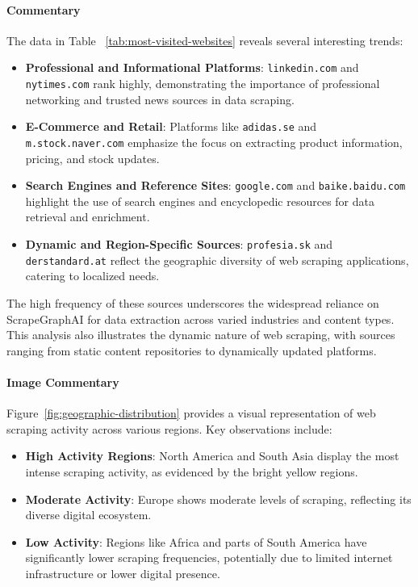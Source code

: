 \paragraph{Commentary}
The data in Table ~\ref{tab:most-visited-websites} reveals several interesting trends:
\begin{itemize}
    \item \textbf{Professional and Informational Platforms}: \texttt{linkedin.com} and \texttt{nytimes.com} rank highly, demonstrating the importance of professional networking and trusted news sources in data scraping.
    \item \textbf{E-Commerce and Retail}: Platforms like \texttt{adidas.se} and \texttt{m.stock.naver.com} emphasize the focus on extracting product information, pricing, and stock updates.
    \item \textbf{Search Engines and Reference Sites}: \texttt{google.com} and \texttt{baike.baidu.com} highlight the use of search engines and encyclopedic resources for data retrieval and enrichment.
    \item \textbf{Dynamic and Region-Specific Sources}: \texttt{profesia.sk} and \texttt{derstandard.at} reflect the geographic diversity of web scraping applications, catering to localized needs.
\end{itemize}

The high frequency of these sources underscores the widespread reliance on ScrapeGraphAI for data extraction across varied industries and content types. This analysis also illustrates the dynamic nature of web scraping, with sources ranging from static content repositories to dynamically updated platforms.

\paragraph{Image Commentary}
Figure~\ref{fig:geographic-distribution} provides a visual representation of web scraping activity across various regions. Key observations include:
\begin{itemize}
    \item \textbf{High Activity Regions}: North America and South Asia display the most intense scraping activity, as evidenced by the bright yellow regions.
    \item \textbf{Moderate Activity}: Europe shows moderate levels of scraping, reflecting its diverse digital ecosystem.
    \item \textbf{Low Activity}: Regions like Africa and parts of South America have significantly lower scraping frequencies, potentially due to limited internet infrastructure or lower digital presence.
\end{itemize}

